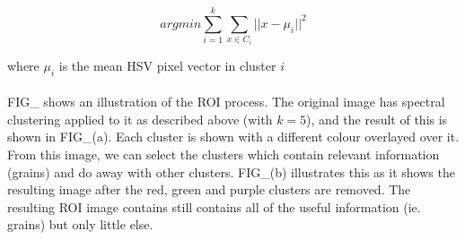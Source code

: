 \begin{equation}
argmin \sum_{i=1}^{k}\sum_{x\in C_i} ||x - \mu_i||^2
\end{equation}

where $\mu_i$ is the mean HSV pixel vector in cluster $i$\\ \\
%
FIG\_ shows an illustration of the ROI process. The original image has spectral clustering applied to it as described above (with $k = 5$), and the result of this is shown in FIG\_(a). Each cluster is shown with a different colour overlayed over it. From this image, we can select the clusters which contain relevant information (grains) and do away with other clusters. FIG\_(b) illustrates this as it shows the resulting image after the red, green and purple clusters are removed. The resulting ROI image contains still contains all of the useful information (ie. grains) but only little else.
